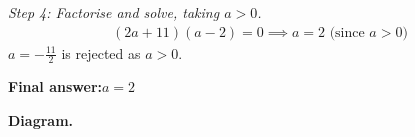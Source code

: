 \documentclass[11pt]{article}
\begin{document}
\textit{Step 4: Factorise and solve, taking \( a > 0 \).}
\[\begin{gathered}
(2a + 11)(a - 2) = 0 \implies a = 2 \text{ (since } a > 0)
\end{gathered}\]
\( a = -\tfrac{11}{2} \) is rejected as \( a > 0 \).

\begin{answerbox}
\textbf{Final answer:}\quad \(\displaystyle a = 2\)
\end{answerbox}
\textbf{Diagram.}

\begin{center}
\end{center}
\end{document}
